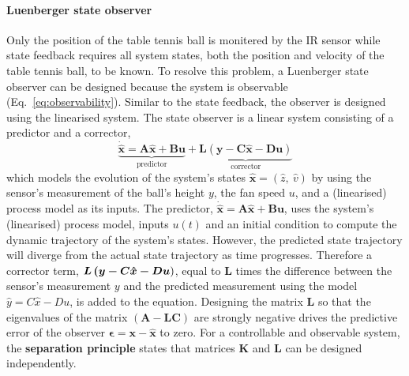 \documentclass[10pt,twoside,openright]{article}
\begin{document}
\paragraph{Luenberger state observer} Only the position of the table tennis ball is monitered by the IR sensor while state feedback requires all system states, both the position and velocity of the table tennis ball, to be known. To resolve this problem, a Luenberger state observer can be designed because the system is observable (Eq.~\ref{eq:observability}). Similar to the state feedback, the observer is designed using the linearised system. The state observer is a linear system consisting of a predictor and a corrector,
\begin{equation}
\underbrace{\bm{\dot{\hat{x}}} = \bm{A\hat{x}} + \bm{B u}}_{\text{predictor}} + \underbrace{ \bm{L} \left(\bm{y} - \bm{C \hat{x}} - \bm{D u} \right)}_{\text{corrector}} 
\end{equation}
which models the evolution of the system's states $\bm{\hat{x}} = (\hat{z},~ \hat{v})$ by using the sensor's measurement of the ball's height $y$, the fan speed $u$, and a (linearised) process model as its inputs. The predictor, $\bm{\dot{\hat{x}}} = \bm{A \hat{x}} + \bm{B u}$, uses the system's (linearised) process model, inputs $u(t)$ and an initial condition to compute the dynamic trajectory of the system's states. However, the predicted state trajectory will diverge from the actual state trajectory as time progresses. Therefore a corrector term, $\bm{ L \left(y - C \hat{x} - D u} \right)$, equal to $\bm{L}$ times the difference between the sensor's measurement $y$ and the predicted measurement using the model $\hat{y} = C \hat{x} - D u$, is added to the equation. Designing the matrix $\bm{L}$ so that the eigenvalues of the matrix $(\bm{A} - \bm{L C})$ are strongly negative drives the predictive error of the observer $\bm{\epsilon} = \bm{x -\hat{x}}$ to zero. For a controllable and observable system, the \textbf{separation principle} states that matrices $\bm{K}$ and $\bm{L}$ can be designed independently.
\end{document}
